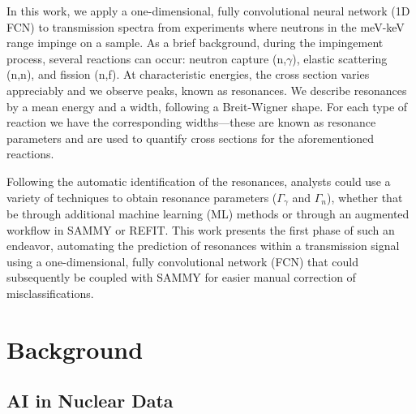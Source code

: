 \documentclass{style/nseJournal}
\begin{document}
In this work, we apply a one-dimensional, fully convolutional neural network (1D FCN) to transmission spectra from experiments where neutrons in the meV-keV range impinge on a sample. As a brief background, during the impingement process, several reactions can occur: neutron capture (n,$\gamma$), elastic scattering (n,n), and fission (n,f). At characteristic energies, the cross section varies appreciably and we observe peaks, known as resonances. We describe resonances by a mean energy and a width, following a Breit-Wigner shape. For each type of reaction we have the corresponding widths---these are known as resonance parameters and are used to quantify cross sections for the aforementioned reactions. 

Following the automatic identification of the resonances, analysts could use a variety of techniques to obtain resonance parameters ($\Gamma_\gamma$ and $\Gamma_n$), whether that be through additional machine learning (ML) methods or through an augmented workflow in SAMMY or REFIT. This work presents the first phase of such an endeavor, automating the prediction of resonances within a transmission signal using a one-dimensional, fully convolutional network (FCN) that could subsequently be coupled with SAMMY for easier manual correction of misclassifications.


\section{Background}\label{sec:background}

\subsection{AI in Nuclear Data}
\end{document}
